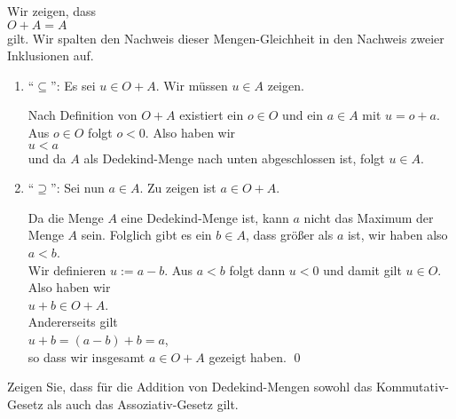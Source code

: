 \solution
Wir zeigen, dass
\\[0.2cm]
\hspace*{1.3cm}
$O + A = A$
\\[0.2cm]
gilt.  Wir spalten den Nachweis dieser Mengen-Gleichheit in den Nachweis zweier Inklusionen auf.
\begin{enumerate}
\item ``$\subseteq$'': Es sei $u \in O + A$.  Wir m\"ussen $u \in A$ zeigen.

      Nach Definition von $O + A$ existiert ein $o \in O$
      und ein $a \in A$ mit $u = o + a$.  Aus $o \in O$ folgt $o < 0$.  Also haben wir
      \\[0.2cm]
      \hspace*{1.3cm}
      $u < a$
      \\[0.2cm]
      und da $A$ als Dedekind-Menge nach unten abgeschlossen ist, folgt $u \in A$.
\item ``$\supseteq$'': Sei nun $a \in A$.  Zu zeigen ist $a \in O + A$.

      Da die Menge $A$ eine Dedekind-Menge ist, kann $a$ nicht das Maximum der Menge $A$ sein.
      Folglich gibt es ein $b \in A$, dass gr\"o\ss{}er als $a$ ist, wir haben also
      \\[0.2cm]
      \hspace*{1.3cm}
      $a < b$.
      \\[0.2cm]
      Wir definieren $u := a - b$.  Aus $a < b$ folgt dann $u < 0$ und damit gilt $u \in O$.
      Also haben wir
      \\[0.2cm]
      \hspace*{1.3cm}
      $u + b \in O + A$.
      \\[0.2cm]
      Andererseits gilt
      \\[0.2cm]
      \hspace*{1.3cm}
      $u + b = (a - b) + b = a$,
      \\[0.2cm]
      so dass wir insgesamt $a \in O + A$ gezeigt haben. \qed
\end{enumerate}

\exercise
Zeigen Sie, dass f\"ur die Addition von Dedekind-Mengen sowohl das Kommutativ-Gesetz als auch das
Assoziativ-Gesetz gilt. \eox


